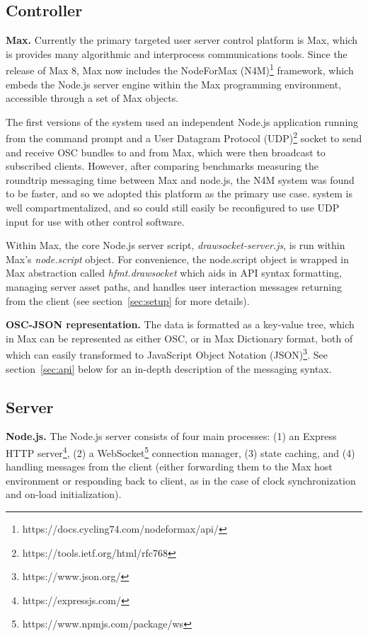 \subsection{Controller}
\noindent
\textbf{Max.}
Currently the primary targeted user server control platform is Max, which is provides many algorithmic and interprocess communications tools. 
Since the release of Max 8, Max now includes the NodeForMax (N4M)\footnote{https://docs.cycling74.com/nodeformax/api/} framework, which embeds the Node.js server engine within the Max programming environment, accessible through a set of Max objects.

The first versions of the \drawsocket system used an independent Node.js application running from the command prompt and a User Datagram Protocol (UDP)\footnote{https://tools.ietf.org/html/rfc768} socket to send and receive OSC bundles to and from Max, which were then broadcast to subscribed clients.
However, after comparing benchmarks measuring the roundtrip messaging time between Max and node.js, the N4M system was found to be faster, and so we adopted this platform as the primary use case.
\drawsocket system is well compartmentalized, and so could still easily be reconfigured to use UDP input for use with other control software.

Within Max, the core Node.js server script, \textit{drawsocket-server.js}, is run within Max's \textit{node.script} object. 
For convenience, the node.script object is wrapped in Max abstraction called \textit{hfmt.drawsocket} which aids in API syntax formatting, managing server asset paths, and handles user interaction messages returning from the client (see section~\ref{sec:setup} for more details).

\medskip
\noindent
\textbf{OSC-JSON representation.}
The \drawsocket data is formatted as a key-value tree, which in Max can be represented as either OSC, or in Max Dictionary format,
both of which can easily transformed to JavaScript Object Notation (JSON)\footnote{https://www.json.org/}. See section~\ref{sec:api} below for an in-depth description of the \drawsocket messaging syntax.

\subsection{Server}
\noindent
\textbf{Node.js.}
The Node.js server consists of four main processes: (1) an Express HTTP server\footnote{https://expressjs.com/}, (2) a WebSocket\footnote{https://www.npmjs.com/package/ws} connection manager, (3) state caching, and (4) handling messages from the client (either forwarding them to the Max host environment or responding back to client,  as in the case of clock synchronization and on-load initialization).

